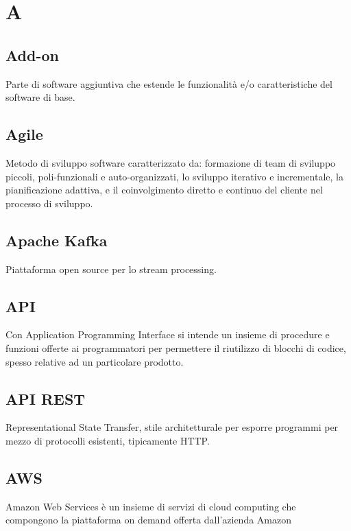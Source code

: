 \section*{A}
\subsection*{Add-on}
Parte di software aggiuntiva che estende le funzionalità e/o caratteristiche del software di base.

\subsection*{Agile}
Metodo di sviluppo software caratterizzato da: formazione di team di sviluppo piccoli, poli-funzionali e auto-organizzati, lo sviluppo iterativo e incrementale, la pianificazione adattiva, e il coinvolgimento diretto e continuo del cliente nel processo di sviluppo.

\subsection*{Apache Kafka}
Piattaforma open source per lo stream processing.

\subsection*{API}
Con Application Programming Interface si intende un insieme di procedure e funzioni offerte ai programmatori per permettere il riutilizzo di blocchi di codice, spesso relative ad un particolare prodotto. 

\subsection*{API REST}
Representational State Transfer, stile architetturale per esporre programmi per mezzo di protocolli esistenti, tipicamente HTTP.

\subsection*{AWS}
Amazon Web Services è un insieme di servizi di cloud computing che compongono la piattaforma on demand offerta dall'azienda Amazon

